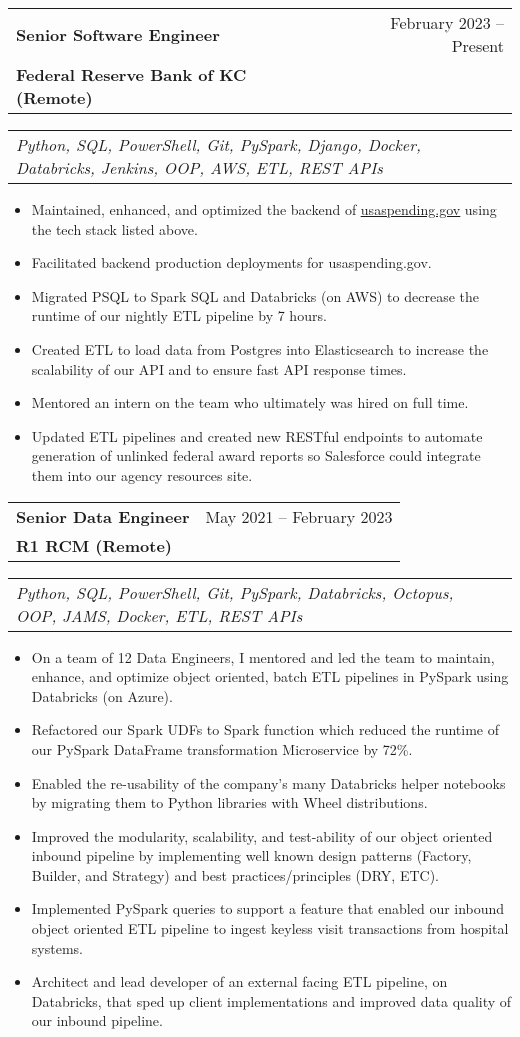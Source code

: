 \documentclass[letterpaper,11pt]{article}
\makeatletter
\newcommand{\resumeItem}[1]{
  \item\small{
    {#1 \vspace{1pt}}
  }
}
\newcommand{\resumeExperienceSubheading}[4]{
  \vspace{9pt}\item
    \begin{tabular*}{0.97\textwidth}[t]{l@{\extracolsep{\fill}}r}
      \textbf{#1} & #2 \\
      \textbf{#3} & \textit{\small #4} \\
    \end{tabular*}\vspace{2pt}
}
\newcommand{\resumeSubSubheading}[1]{
    \vspace{-15pt}\item
    \begin{tabular*}{0.97\textwidth}{l@{\extracolsep{\fill}}r}
      \textit{#1} \\
    \end{tabular*}\vspace{2pt}
}
\newcommand{\resumeItemListStart}{\begin{itemize}}
\newcommand{\resumeItemListEnd}{\end{itemize}\vspace{-5pt}}
\makeatother
\begin{document}
    \resumeExperienceSubheading
      {Senior Software Engineer}{February 2023 -- Present}
      {Federal Reserve Bank of KC (Remote)}{}
    \resumeSubSubheading
        {Python, SQL, PowerShell, Git, PySpark, Django, Docker, Databricks, Jenkins, OOP, AWS, ETL, REST APIs}{}
      \resumeItemListStart
        \resumeItem{Maintained, enhanced, and optimized the backend of \href{https://www.usaspending.gov/} {\underline{usaspending.gov}} using the tech stack listed above.}
        \resumeItem{Facilitated backend production deployments for usaspending.gov.}
        \resumeItem{Migrated PSQL to Spark SQL and Databricks (on AWS) to decrease the runtime of our nightly ETL pipeline by 7 hours.}
        \resumeItem{Created ETL to load data from Postgres into Elasticsearch to increase the scalability of our API and to ensure fast API response times.}
        \resumeItem{Mentored an intern on the team who ultimately was hired on full time.}
        \resumeItem{Updated ETL pipelines and created new RESTful endpoints to automate generation of unlinked federal award reports so Salesforce could integrate them into our agency resources site.}
      \resumeItemListEnd
      


    \resumeExperienceSubheading
          {Senior Data Engineer}{May 2021 -- February 2023}
          {R1 RCM (Remote)}{}
      \resumeSubSubheading
        {Python, SQL, PowerShell, Git, PySpark, Databricks, Octopus, OOP, JAMS, Docker, ETL, REST APIs}{}
      \resumeItemListStart
        \resumeItem{On a team of 12 Data Engineers, I mentored and led the team to maintain, enhance, and optimize object oriented, batch ETL pipelines in PySpark using Databricks (on Azure).}
        \resumeItem{Refactored our Spark UDFs to Spark function which reduced the runtime of our PySpark DataFrame transformation Microservice by 72\%.}
        \resumeItem{Enabled the re-usability of the company's many Databricks helper notebooks by migrating them to Python libraries with Wheel distributions.}
        \resumeItem{Improved the modularity, scalability, and test-ability of our object oriented inbound pipeline by implementing well known design patterns (Factory, Builder, and Strategy) and best practices/principles (DRY, ETC).}
        \resumeItem{Implemented PySpark queries to support a feature that enabled our inbound object oriented ETL pipeline to ingest keyless visit transactions from hospital systems.}
        \resumeItem{Architect and lead developer of an external facing ETL pipeline, on Databricks, that sped up client implementations and improved data quality of our inbound pipeline.}
    \resumeItemListEnd
\end{document}
